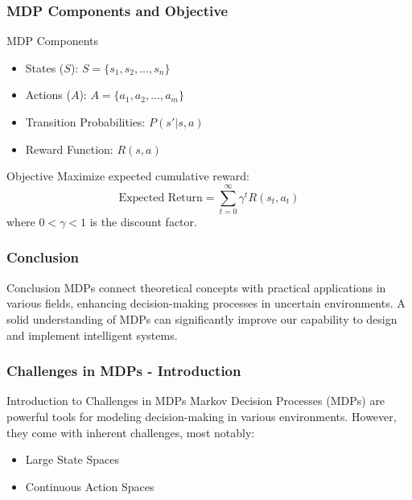\documentclass[aspectratio=169]{beamer}
\begin{document}
\begin{frame}[fragile]
  \frametitle{MDP Components and Objective}
  \begin{block}{MDP Components}
    \begin{itemize}
      \item States (\( S \)): \( S = \{s_1, s_2, ... , s_n\} \)
      \item Actions (\( A \)): \( A = \{a_1, a_2, ... , a_m\} \)
      \item Transition Probabilities: \( P(s'|s, a) \)
      \item Reward Function: \( R(s, a) \)
    \end{itemize}
  \end{block}
  \begin{block}{Objective}
    Maximize expected cumulative reward:
    \[
    \text{Expected Return} = \sum_{t=0}^{\infty} \gamma^t R(s_t, a_t)
    \]
    where \( 0 < \gamma < 1 \) is the discount factor.
  \end{block}
\end{frame}

\begin{frame}[fragile]
  \frametitle{Conclusion}
  \begin{block}{Conclusion}
    MDPs connect theoretical concepts with practical applications in various fields, enhancing decision-making processes in uncertain environments. A solid understanding of MDPs can significantly improve our capability to design and implement intelligent systems.
  \end{block}
\end{frame}

\begin{frame}[fragile]
  \frametitle{Challenges in MDPs - Introduction}
  \begin{block}{Introduction to Challenges in MDPs}
    Markov Decision Processes (MDPs) are powerful tools for modeling decision-making in various environments. However, they come with inherent challenges, most notably:
  \end{block}
  \begin{itemize}
    \item Large State Spaces
    \item Continuous Action Spaces
  \end{itemize}
\end{frame}
\end{document}
